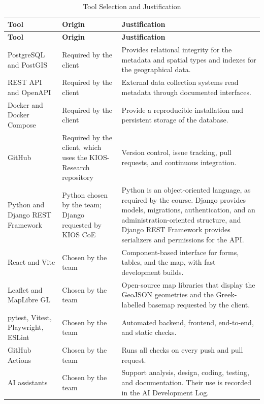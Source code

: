 \documentclass[11pt,a4paper]{article}
\begin{document}
\begin{longtable}{P{3.4cm} P{3.2cm} P{8.5cm}}
\caption{Tool Selection and Justification}
\label{tab:phase3_tool_choice}\\

\toprule
\textbf{Tool} & \textbf{Origin} & \textbf{Justification} \\
\midrule
\endfirsthead

\toprule
\textbf{Tool} & \textbf{Origin} & \textbf{Justification} \\
\midrule
\endhead

\bottomrule
\endfoot

PostgreSQL and PostGIS &
Required by the client &
Provides relational integrity for the metadata and spatial types and
indexes for the geographical data. \\

REST API and OpenAPI &
Required by the client &
External data collection systems read metadata through documented
interfaces. \\

Docker and Docker Compose &
Required by the client &
Provide a reproducible installation and persistent storage of the
database. \\

GitHub &
Required by the client, which uses the KIOS-Research repository &
Version control, issue tracking, pull requests, and continuous
integration. \\

Python and Django REST Framework &
Python chosen by the team; Django requested by KIOS CoE &
Python is an object-oriented language, as required by the course.
Django provides models, migrations, authentication, and an
administration-oriented structure, and Django REST Framework provides
serializers and permissions for the API. \\

React and Vite &
Chosen by the team &
Component-based interface for forms, tables, and the map, with fast
development builds. \\

Leaflet and MapLibre GL &
Chosen by the team &
Open-source map libraries that display the GeoJSON geometries and the
Greek-labelled basemap requested by the client. \\

pytest, Vitest, Playwright, ESLint &
Chosen by the team &
Automated backend, frontend, end-to-end, and static checks. \\

GitHub Actions &
Chosen by the team &
Runs all checks on every push and pull request. \\

AI assistants &
Chosen by the team &
Support analysis, design, coding, testing, and documentation. Their use
is recorded in the AI Development Log. \\

\end{longtable}
\end{document}
